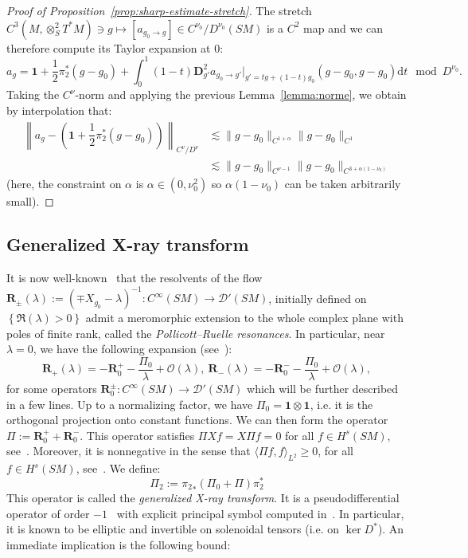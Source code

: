 \documentclass[AHL,Unicode,longabstracts,published]{cedram}
\newcommand{\RR}{\mathbf{R}}
\newcommand{\bdD}{\mathbf{D}}
\newcommand{\bfun}{\mathbf{1}}
\newcommand{\mc}{\mathcal}
\newcommand{\dd}{\mathrm{d}}
\begin{document}
\begin{proof}[Proof of Proposition~\ref{prop:sharp-estimate-stretch}]
The stretch $C^3(M,\otimes^2_S T^*M) \ni g \mapsto [a_{g_0 \to g}] \in C^{\nu_0}/D^{\nu_0}(SM)$ is a $C^2$ map and we can therefore compute its Taylor expansion at $0$:
\[
a_g = \bfun + \dfrac{1}{2} \pi_2^*(g-g_0) + \int_0^1 (1-t) \bdD^2_{g'} a_{g_0 \to g'}|_{g'=tg + (1-t)g_0} (g-g_0,g-g_0) \dd t \mod D^{\nu_0}.
\]
Taking the $C^{\nu}$-norm and applying the previous Lemma~\ref{lemma:norme}, we obtain by interpolation that:
\begin{align*}
\left\|a_g - \left(\bfun + \dfrac{1}{2} \pi_2^*(g-g_0)\right)\right\|_{C^{\nu}/D^{\nu}} &\lesssim \|g-g_0\|_{C^{1+\alpha}}\|g-g_0\|_{C^{1}}\\
& \lesssim \|g-g_0\|_{C^{\nu-1}} \|g-g_0\|_{C^{3+\alpha(1-\nu_0)}}
\end{align*}
(here, the constraint on $\alpha$ is $\alpha \in (0,\nu_0^2)$ so $\alpha(1-\nu_0)$ can be taken arbitrarily small).
\end{proof}



\subsection{Generalized X-ray transform}

It is now well-known~\cite{Dyatlov-Zworski-16,Faure-Sjostrand-11,Faure-Tsuji-13,Giulietti-Liverani-Pollicott-13} that the resolvents of the flow $\RR_{\pm}(\lambda) := (\mp X_{g_0}-\lambda)^{-1} : C^\infty(SM) \rightarrow \mc{D}'(SM)$, initially defined on $\left\{\Re(\lambda) > 0 \right\}$ admit a meromorphic extension to the whole complex plane with poles of finite rank, called the \emph{Pollicott--Ruelle resonances}. In particular, near $\lambda = 0$, we have the following expansion (see~\cite[Section~2.3]{Guillarmou-17-1}):
\[
\RR_+(\lambda) = -\RR_0^+ - \dfrac{\Pi_0}{\lambda} + \mc{O}(\lambda),\ \RR_-(\lambda) = -\RR_0^- - \dfrac{\Pi_0}{\lambda} + \mc{O}(\lambda),
\]
for some operators $\RR_0^{\pm} : C^\infty(SM) \rightarrow \mc{D}'(SM)$ which will be further described in a few lines. Up to a normalizing factor, we have $\Pi_0 = \bfun \otimes \bfun$, i.e. it is the orthogonal projection onto constant functions. We can then form the operator $\Pi := \RR_0^+ + \RR_0^-$. This operator satisfies $\Pi X f= X \Pi f= 0$ for all $f \in H^s(SM)$, see~\cite[Theorem~2.6]{Guillarmou-17-1}. Moreover, it is nonnegative in the sense that $\langle \Pi f, f \rangle_{L^2} \geq 0$, for all $f \in H^s(SM)$, see~\cite[Lemma~4.3]{Gouezel-Lefeuvre-19}. We define:
\[
\Pi_2 := {\pi_2}_*(\Pi_0 + \Pi) \pi_2^*
\]
This operator is called the \emph{generalized X-ray transform}. It is a pseudodifferential operator of order $-1$~\cite[Theorem~3.1]{Guillarmou-17-1} with explicit principal symbol computed in~\cite[Theorem~4.4]{Gouezel-Lefeuvre-19}. In particular, it is known to be elliptic and invertible on solenoidal tensors (i.e. on $\ker D^*$). An immediate implication is the following bound:
\end{document}
